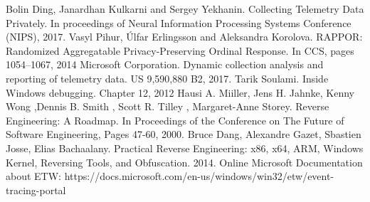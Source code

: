 \begin{thebibliography}{6}
 Bolin Ding, Janardhan Kulkarni and Sergey Yekhanin. Collecting Telemetry Data Privately. In proceedings of Neural Information Processing Systems Conference (NIPS),  2017.
 Vasyl Pihur, Úlfar Erlingsson and Aleksandra Korolova. RAPPOR: Randomized Aggregatable Privacy-Preserving Ordinal Response. In CCS, pages 1054–1067, 2014
 Microsoft Corporation. Dynamic collection analysis and reporting of telemetry data. US 9,590,880 B2, 2017.
 Tarik Soulami. Inside Windows debugging. Chapter 12, 2012
 Hausi A. Miiller, Jens H. Jahnke, Kenny Wong ,Dennis B. Smith , Scott R. Tilley , Margaret-Anne Storey. Reverse Engineering: A Roadmap. In Proceedings of the Conference on The Future of Software Engineering, Pages 47-60, 2000.
 Bruce Dang,  Alexandre Gazet, Sbastien Josse,  Elias Bachaalany. Practical Reverse Engineering: x86, x64, ARM, Windows Kernel, Reversing Tools, and Obfuscation. 2014.
 Online Microsoft Documentation about ETW: https://docs.microsoft.com/en-us/windows/win32/etw/event-tracing-portal
\end{thebibliography}
